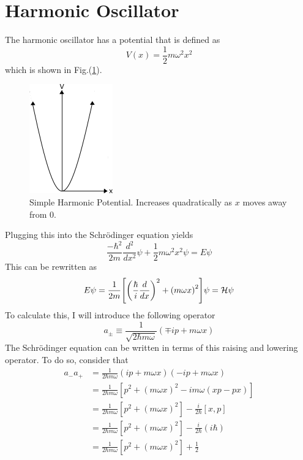 \section{Harmonic Oscillator}
The harmonic oscillator has a potential that is defined as 
\begin{equation}
    V(x)=\frac{1}{2}m\omega^2 x^2
\end{equation}
which is shown in Fig.(\ref{fig:SHOpot}). 
\begin{figure}
    \centering
    \includegraphics{figures/pdf/SHOpot.png}
    \caption{Simple Harmonic Potential. Increases quadratically as $x$ moves away from 0.}
    \label{fig:SHOpot}
\end{figure}
Plugging this into the Schr\"odinger equation yields
\begin{equation}
    \frac{-\hbar^2}{2m}\frac{d^2}{dx^2}\psi+\frac{1}{2}m\omega^2 x^2\psi=E\psi
\end{equation}
This can be rewritten as 
\begin{equation}
    E\psi=\frac{1}{2m}\qty[\qty(\frac{\hbar}{i}\frac{d}{dx})^2+\qty(m\omega x)^2]\psi=\mathcal{H}\psi
\end{equation}
To calculate this, I will introduce the following operator
\begin{equation}
    a_{\pm}\equiv \frac{1}{\sqrt{2\hbar m \omega}} (\mp ip+m\omega x)
\end{equation}
The Schr\"odinger equation can be written in terms of this raising and lowering operator. To do so, consider that
\begin{align}
    a_-a_+&=\frac{1}{2\hbar m\omega} (ip+m\omega x)(-ip+m\omega x)\nonumber\\
    &=\frac{1}{2\hbar m\omega} [p^2+(m\omega x)^2-im\omega (xp-px)]\nonumber\\
    &=\frac{1}{2\hbar m\omega} [p^2+(m\omega x)^2]-\frac{i}{2\hbar}[x,p]\nonumber\\
    &=\frac{1}{2\hbar m\omega} [p^2+(m\omega x)^2]-\frac{i}{2\hbar}(i\hbar)\nonumber\\
    &=\frac{1}{2\hbar m\omega} [p^2+(m\omega x)^2]+\frac{1}{2}
\end{align}
